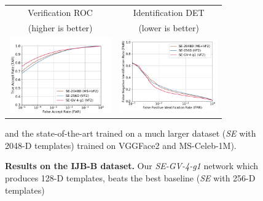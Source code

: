 
\begin{figure}[t]
\captionsetup{font=small}
\begin{center}
\begin{tabular}{c@{~~~~~}c}
Verification ROC & Identification DET \\
{\scriptsize (higher is better)} & {\scriptsize (lower is better)} \\ [0.1cm]
%
%
%
%
\includegraphics[align=c,width=44mm,clip,trim=0 0 0 1cm]{images/roc_ijbb} &
\includegraphics[align=c,width=42mm,clip,trim=0 0.5cm 0 0]{images/1N_DET_ijbb}
\end{tabular}
\end{center}
\vspace{-2mm}
\caption{{\bf Results on the IJB-B dataset.} 
%
%
Our \emph{SE-GV-4-g1} network which produces 128-D templates,
beats the best baseline (\emph{SE} with 256-D templates)}
and the state-of-the-art trained on a much larger dataset
(\emph{SE} with 2048-D templates) trained on VGGFace2 and MS-Celeb-1M).
\label{fig:ijb}
\vspace{-4mm}
\end{figure}



